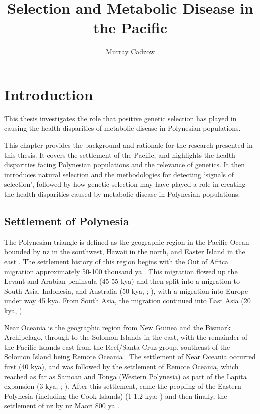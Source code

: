 \documentclass[]{report}
\title{Selection and Metabolic Disease in the Pacific}
\author{Murray Cadzow}
\date{}
\newcommand{\tex}[1]{#1}
\begin{document}
\maketitle

\address{710 Cumberland St, Dunedin, NZ}

\frontstuff

\chapter{Introduction}\label{introduction}

\glsresetall

This thesis investigates the role that positive genetic selection has
played in causing the health disparities of metabolic disease in
Polynesian populations.

This chapter provides the background and rationale for the research
presented in this thesis. It covers the settlement of the Pacific, and
highlights the health disparities facing Polynesian populations and the
relevance of genetics. It then introduces natural selection and the
methodologies for detecting `signals of selection', followed by how
genetic selection may have played a role in creating the health
disparities caused by metabolic disease in Polynesian populations.

\section{Settlement of Polynesia}\label{settlement-of-polynesia}

The Polynesian triangle is defined as the geographic region in the
Pacific Ocean bounded by \Gls{nz} in the southwest, Hawaii in the north,
and Easter Island in the east \citep{Barcham2009}. The settlement
history of this region begins with the Out of Africa migration
approximately 50-100 thousand \gls{ya} \citep{Nielsen2017}. This
migration flowed up the Levant and Arabian peninsula (45-55 k\gls{ya})
and then split into a migration to South Asia, Indonesia, and Australia
(50 k\gls{ya}, \citet{Kivisild1999}; \citet{Quintana-Murci1999}), with a
migration into Europe under way 45 k\gls{ya}. From South Asia, the
migration continued into East Asia (20 k\gls{ya}, \citet{Groucutt2015}).

Near Oceania is the geographic region from New Guinea and the Bismark
Archipelago, through to the Solomon Islands in the east, with the
remainder of the Pacific Islands east from the Reef/Santa Cruz group,
southeast of the Solomon Island being Remote Oceania
\citep{Matisoo-Smith2018}. The settlement of Near Oceania occurred first
(40 k\gls{ya}), and was followed by the settlement of Remote Oceania,
which reached as far as Samoan and Tonga (Western Polynesia) as part of
the Lapita expansion (3 k\gls{ya}, \citet{Matisoo-Smith2015};
\citet{Skoglund2016}). After this settlement, came the peopling of the
Eastern Polynesia (including the Cook Islands) (1-1.2 k\gls{ya};
\citet{Wilmshurst2011}) and then finally, the settlement of \glsdesc{nz}
by \gls{nz} M\tex{\={a}}ori 800 \gls{ya}
\citep{Duggan2014, Matisoo-Smith2015}.
\end{document}
